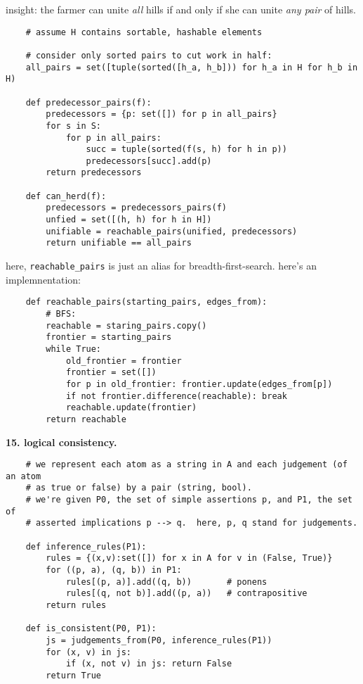 \documentclass{article}
\newcommand{\cd}{\texttt}
\begin{document}
        insight: the farmer can unite \emph{all} hills if and only if
                 she can unite \emph{any pair} of hills.
\begin{verbatim}
    # assume H contains sortable, hashable elements

    # consider only sorted pairs to cut work in half:
    all_pairs = set([tuple(sorted([h_a, h_b])) for h_a in H for h_b in H)

    def predecessor_pairs(f):
        predecessors = {p: set([]) for p in all_pairs}
        for s in S:
            for p in all_pairs:
                succ = tuple(sorted(f(s, h) for h in p)) 
                predecessors[succ].add(p)
        return predecessors

    def can_herd(f): 
        predecessors = predecessors_pairs(f)
        unfied = set([(h, h) for h in H])
        unifiable = reachable_pairs(unified, predecessors) 
        return unifiable == all_pairs
\end{verbatim}

\vfill
\noindent here, \cd{reachable\_pairs} is just an alias for
breadth-first-search.  here's an implemnentation:
\begin{verbatim}
    def reachable_pairs(starting_pairs, edges_from):
        # BFS: 
        reachable = staring_pairs.copy()
        frontier = starting_pairs
        while True:
            old_frontier = frontier
            frontier = set([])
            for p in old_frontier: frontier.update(edges_from[p]) 
            if not frontier.difference(reachable): break
            reachable.update(frontier)
        return reachable
\end{verbatim}

\newpage
    \par\noindent\hspace{-1cm}
    \textbf{15. logical consistency.}

\begin{verbatim}
    # we represent each atom as a string in A and each judgement (of an atom
    # as true or false) by a pair (string, bool).
    # we're given P0, the set of simple assertions p, and P1, the set of
    # asserted implications p --> q.  here, p, q stand for judgements.

    def inference_rules(P1):
        rules = {(x,v):set([]) for x in A for v in (False, True)}
        for ((p, a), (q, b)) in P1:
            rules[(p, a)].add((q, b))       # ponens
            rules[(q, not b)].add((p, a))   # contrapositive
        return rules

    def is_consistent(P0, P1):
        js = judgements_from(P0, inference_rules(P1))
        for (x, v) in js:
            if (x, not v) in js: return False
        return True
\end{verbatim}
\end{document}

